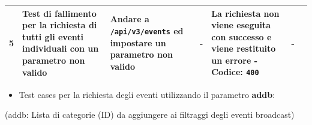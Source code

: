 \documentclass{article}
\begin{document}
\begin{table}[htbp]
\begin{tabularx}{\textwidth}{| r | X | X | X | X | X | X |}
        \hline
        5 & Test di fallimento per la richiesta di tutti gli eventi individuali con un parametro non valido & Andare a \texttt{/api/v3/events} ed impostare un parametro non valido & - & La richiesta non viene eseguita con successo e viene restituito un errore - Codice: \texttt{400} & - \\
        \hline
    \end{tabularx}
\end{table}

\clearpage

\begin{itemize}
    \item Test cases per la richiesta degli eventi utilizzando il parametro \textbf{addb}:
\end{itemize}
(addb: Lista di categorie (ID) da aggiungere ai filtraggi degli eventi broadcast)
\end{document}
